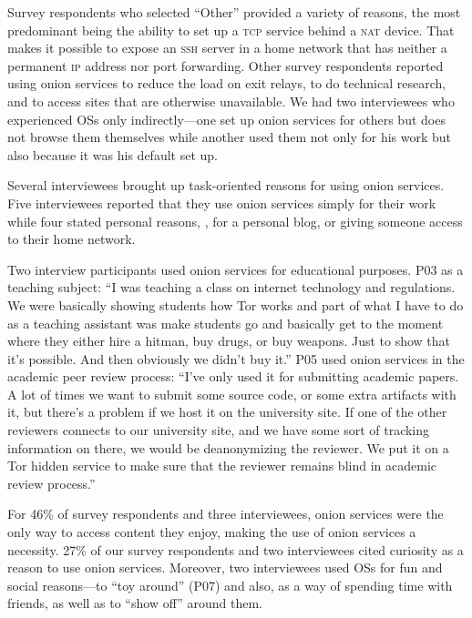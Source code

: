 Survey respondents who selected ``Other'' provided a variety of reasons, the
most predominant being the ability to set up a \textsc{tcp} service behind a
\textsc{nat} device.  That makes it possible to expose an \textsc{ssh} server in
a home network that has neither a permanent \textsc{ip} address nor port
forwarding.  Other survey respondents reported using onion services to reduce
the load on exit relays, to do technical research, and to access sites that are
otherwise unavailable.  We had two interviewees who experienced OSs only
indirectly---one set up onion services for others but does not browse them
themselves while another used them not only for his work but also because it was
his default set up.

Several interviewees brought up task-oriented reasons for using onion services.
Five interviewees reported that they use onion services simply for their work
while four stated personal reasons, \eg, for a personal blog, or giving someone
access to their home network.  

Two interview participants used onion services for educational purposes.  P03 as
a teaching subject: ``I was teaching a class on internet technology and
regulations.  We were basically showing students how Tor works and part of what
I have to do as a teaching assistant was make students go and basically get to
the moment where they either hire a hitman, buy drugs, or buy weapons.  Just to
show that it's possible. And then obviously we didn't buy it.'' P05 used onion
services in the academic peer review process: ``I've only used it for submitting
academic papers.  A lot of times we want to submit some source code, or some
extra artifacts with it, but there's a problem if we host it on the university
site.  If one of the other reviewers connects to our university site, and we
have some sort of tracking information on there, we would be deanonymizing the
reviewer.  We put it on a Tor hidden service to make sure that the reviewer
remains blind in academic review process.''

For 46\% of survey respondents and three interviewees, onion services were the
only way to access content they enjoy, making the use of onion services a
necessity.  27\% of our survey respondents and two interviewees cited curiosity
as a reason to use onion services.  Moreover, two interviewees used OSs for fun
and social reasons---to ``toy around'' (P07) and also, as a way of spending time
with friends, as well as to ``show off'' around them.

